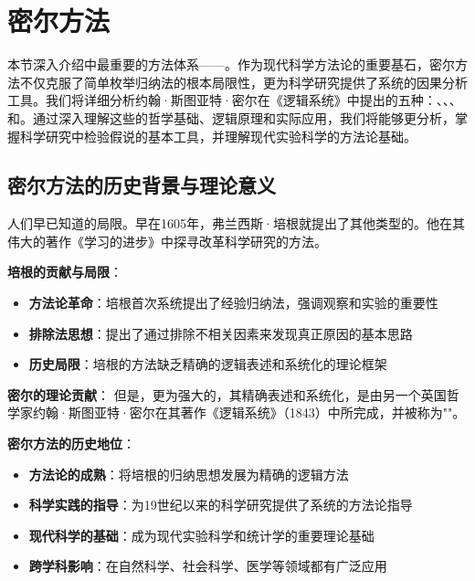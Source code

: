 \section{密尔方法}

\begin{logicbox}[title=引言]
本节深入介绍中最重要的方法体系——。作为现代科学方法论的重要基石，密尔方法不仅克服了简单枚举归纳法的根本局限性，更为科学研究提供了系统的因果分析工具。我们将详细分析约翰·斯图亚特·密尔在《逻辑系统》中提出的五种：、、、和。通过深入理解这些的哲学基础、逻辑原理和实际应用，我们将能够更分析，掌握科学研究中检验假说的基本工具，并理解现代实验科学的方法论基础。
\end{logicbox}

\subsection{密尔方法的历史背景与理论意义}

\begin{theorembox}[title=从培根到密尔：归纳方法的历史发展]
人们早已知道的局限。早在1605年，弗兰西斯·培根就提出了其他类型的。他在其伟大的著作《学习的进步》中探寻改革科学研究的方法。

\textbf{培根的贡献与局限}：
\begin{itemize}
\item \textbf{方法论革命}：培根首次系统提出了经验归纳法，强调观察和实验的重要性
\item \textbf{排除法思想}：提出了通过排除不相关因素来发现真正原因的基本思路
\item \textbf{历史局限}：培根的方法缺乏精确的逻辑表述和系统化的理论框架
\end{itemize}

\textbf{密尔的理论贡献}：
但是，更为强大的，其精确表述和系统化，是由另一个英国哲学家约翰·斯图亚特·密尔在其著作《逻辑系统》（1843）中所完成，并被称为""。

\textbf{密尔方法的历史地位}：
\begin{itemize}
\item \textbf{方法论的成熟}：将培根的归纳思想发展为精确的逻辑方法
\item \textbf{科学实践的指导}：为19世纪以来的科学研究提供了系统的方法论指导
\item \textbf{现代科学的基础}：成为现代实验科学和统计学的重要理论基础
\item \textbf{跨学科影响}：在自然科学、社会科学、医学等领域都有广泛应用
\end{itemize}
\end{theorembox}

